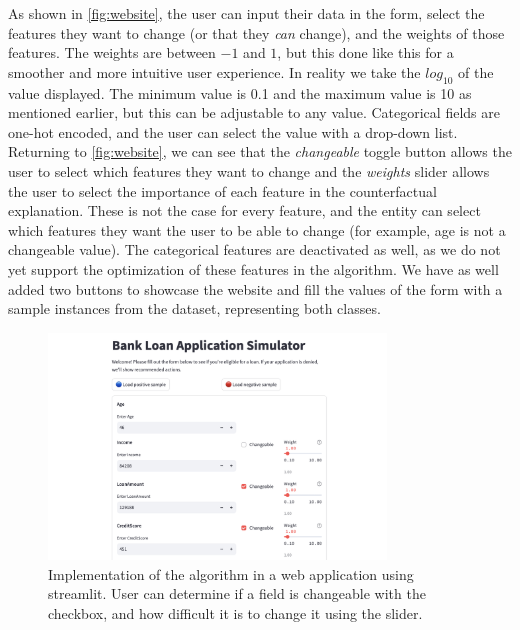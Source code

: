 \documentclass[12pt]{extarticle}
\numberwithin{equation}{section}
\begin{document}
As shown in \autoref{fig:website}, the user can input their data in the form, select the features they want to change (or that they \emph{can} change), and the weights of those features. The weights are between $-1$ and $1$, but this done like this for a smoother and more intuitive user experience. In reality we take the $log_{10}$ of the value displayed. The minimum value is 0.1 and the maximum value is 10 as mentioned earlier, but this can be adjustable to any value. 
Categorical fields are one-hot encoded, and the user can select the value with a drop-down list. Returning to \autoref{fig:website}, we can see that the \emph{changeable} toggle button allows the user to select which features they want to change and the \emph{weights} slider allows the user to select the importance of each feature in the counterfactual explanation. These is not the case for every feature, and the entity can select which features they want the user to be able to change (for example, age is not a changeable value). The categorical features are deactivated as well, as we do not yet support the optimization of these features in the algorithm. We have as well added two buttons to showcase the website and fill the values of the form with a sample instances from the dataset, representing both classes.

\begin{figure}[H]
    \centering
    \includegraphics[width=0.8\textwidth]{images/website}
    \caption{Implementation of the algorithm in a web application using streamlit. User can determine if a field is changeable with the checkbox, and how difficult it is to change it using the slider.}
    \label{fig:website}
\end{figure}
\end{document}

